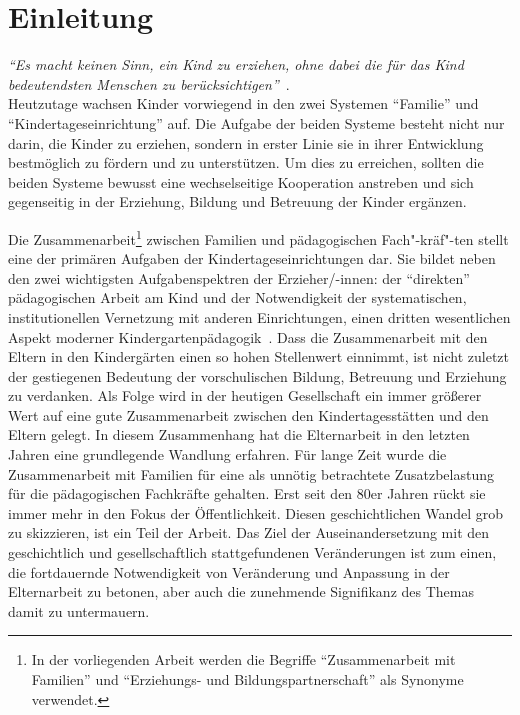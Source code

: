 \documentclass[12pt,a4paper]{article}
\begin{document}
\section{Einleitung}
\textit{"`Es macht keinen Sinn, ein Kind zu erziehen, ohne dabei die für das Kind bedeutendsten Menschen zu berücksichtigen"'}~\parencite{Bruce}.\\
 
 
\noindent Heutzutage wachsen Kinder vorwiegend in den zwei Systemen "`Familie"' und "`Kindertageseinrichtung"' auf. Die Aufgabe der beiden Systeme besteht nicht nur darin, die Kinder zu erziehen, sondern in erster Linie sie in ihrer Entwicklung bestmöglich zu fördern und zu unterstützen. Um dies zu erreichen, sollten die beiden Systeme bewusst eine wechselseitige Kooperation anstreben und sich gegenseitig in der Erziehung, Bildung und Betreuung der Kinder ergänzen.
	  
Die Zusammenarbeit\footnote{In der vorliegenden Arbeit werden die Begriffe "`Zusammenarbeit mit Familien"' und "`Erziehungs- und Bildungspartnerschaft"' als Synonyme verwendet.} zwischen Familien und pädagogischen Fach"-kräf"-ten stellt eine der primären Aufgaben der Kindertageseinrichtungen dar. Sie bildet neben den zwei wichtigsten Aufgabenspektren der Erzieher/-innen: der "`direkten"' pädagogischen Arbeit am Kind und der Notwendigkeit der systematischen, institutionellen Vernetzung mit anderen Einrichtungen, einen dritten wesentlichen Aspekt moderner Kindergartenpädagogik~\parencite[S.~141]{Kasueschke}. Dass die Zusammenarbeit mit den Eltern in den Kindergärten einen so hohen Stellenwert einnimmt, ist nicht zuletzt der gestiegenen Bedeutung der vorschulischen Bildung, Betreuung und Erziehung zu verdanken. Als Folge wird in der heutigen Gesellschaft ein immer größerer Wert auf eine gute Zusammenarbeit zwischen den Kindertagesstätten und den Eltern gelegt. In diesem Zusammenhang hat die Elternarbeit in den letzten Jahren eine grundlegende Wandlung erfahren. Für lange Zeit wurde die Zusammenarbeit mit Familien für eine als unnötig betrachtete Zusatzbelastung für die pädagogischen Fachkräfte gehalten. Erst seit den 80er Jahren rückt sie immer mehr in den Fokus der Öffentlichkeit. Diesen geschichtlichen Wandel grob zu skizzieren, ist ein Teil der Arbeit. Das Ziel der Auseinandersetzung mit den geschichtlich und gesellschaftlich stattgefundenen Veränderungen ist zum einen, die fortdauernde Notwendigkeit von Veränderung und Anpassung in der Elternarbeit zu betonen, aber auch die zunehmende Signifikanz des Themas damit zu untermauern.
\end{document}
